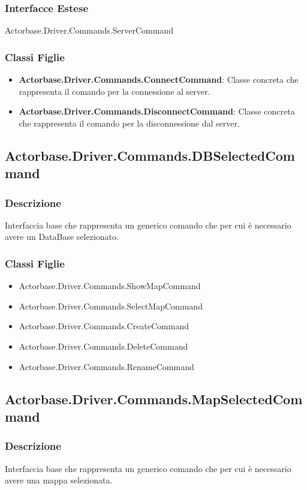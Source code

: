 \documentclass[a4paper]{article}
\begin{document}
			\subsubsection{Interfacce Estese} Actorbase.Driver.Commands.ServerCommand
			\subsubsection{Classi Figlie}
				\begin{itemize}
					\item \textbf{Actorbase.Driver.Commands.ConnectCommand}:
						Classe concreta che rappresenta il comando per la connessione al server.
					\item \textbf{Actorbase.Driver.Commands.DisconnectCommand}:
						Classe concreta che rappresenta il comando per la disconnessione dal server.
				\end{itemize}
		
		\subsection{Actorbase.Driver.Commands.DBSelectedCommand}
				\subsubsection{Descrizione} Interfaccia base che rappresenta un generico comando che per cui è necessario avere un DataBase selezionato.
				\subsubsection{Classi Figlie}
					\begin{itemize}
						\item Actorbase.Driver.Commands.ShowMapCommand
						\item Actorbase.Driver.Commands.SelectMapCommand
						\item Actorbase.Driver.Commands.CreateCommand
						\item Actorbase.Driver.Commands.DeleteCommand
						\item Actorbase.Driver.Commands.RenameCommand
					\end{itemize}


		\subsection{Actorbase.Driver.Commands.MapSelectedCommand}
				\subsubsection{Descrizione} Interfaccia base che rappresenta un generico comando che per cui è necessario avere una mappa selezionata.
\end{document}
